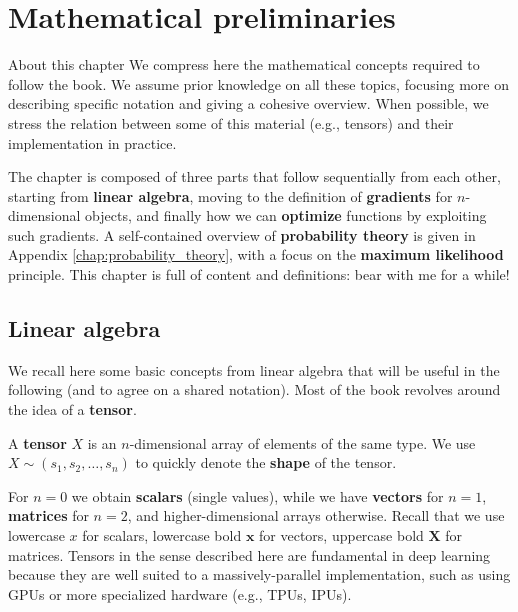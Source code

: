 \chapter{Mathematical preliminaries}
\label{chap:preliminaries}

\begin{supportbox}{About this chapter}
We compress here the mathematical concepts required to follow the book. We assume prior knowledge on all these topics, focusing more on describing specific notation and giving a cohesive overview. When possible, we stress the relation between some of this material (e.g., tensors) and their implementation in practice. 
\end{supportbox}

The chapter is composed of three parts that follow sequentially from each other, starting from \textbf{linear algebra}, moving to the definition of \textbf{gradients} for $n$-dimensional objects, and finally how we can \textbf{optimize} functions by exploiting such gradients. A self-contained overview of \textbf{probability theory} is given in Appendix \ref{chap:probability_theory}, with a focus on the \textbf{maximum likelihood} principle. This chapter is full of content and definitions: bear with me for a while!


\section{Linear algebra}
\label{sec:linear_algebra}

We recall here some basic concepts from linear algebra that will be useful in the following (and to agree on a shared notation). Most of the book revolves around the idea of a \textbf{tensor}.

\begin{definition}[Tensors] \addbottle
  A \textbf{tensor} $X$ is an $n$-dimensional array of elements of the same type. We use $X \sim (s_1, s_2, \ldots, s_n)$ to quickly denote the \textbf{shape} of the tensor.
\end{definition}
%
For $n=0$ we obtain \textbf{scalars} (single values), while we have \textbf{vectors} for $n=1$, \textbf{matrices} for $n=2$, and higher-dimensional arrays otherwise. Recall that we use lowercase $x$ for scalars, lowercase bold $\mathbf{x}$ for vectors, uppercase bold $\mathbf{X}$ for matrices. Tensors in the sense described here are fundamental in deep learning because they are well suited to a massively-parallel implementation, such as using GPUs or more specialized hardware (e.g., TPUs, IPUs).

